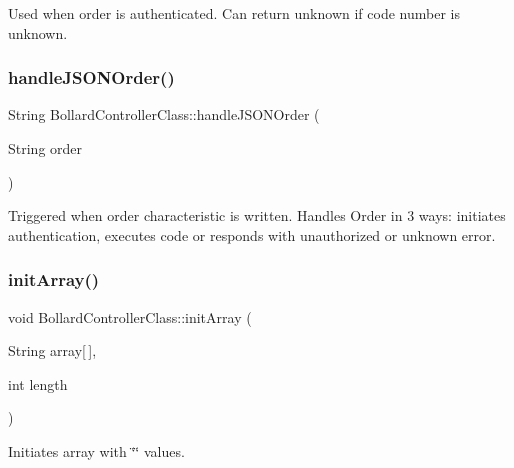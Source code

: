 Used when order is authenticated. Can return unknown if code number is unknown. \mbox{\label{class_bollard_controller_class_a1873a12a6d76aac6d952a08029f3eccd}} 
\subsubsection{\texorpdfstring{handle\+J\+S\+O\+N\+Order()}{handleJSONOrder()}}
{\footnotesize\ttfamily String Bollard\+Controller\+Class\+::handle\+J\+S\+O\+N\+Order (\begin{DoxyParamCaption}\item[{String}]{order }\end{DoxyParamCaption})\hspace{0.3cm}{\ttfamily [private]}}

Triggered when order characteristic is written. Handles Order in 3 ways\+: initiates authentication, executes code or responds with unauthorized or unknown error. \mbox{\label{class_bollard_controller_class_a1e15c0f5b739be3830dc0700842e117e}} 
\subsubsection{\texorpdfstring{init\+Array()}{initArray()}}
{\footnotesize\ttfamily void Bollard\+Controller\+Class\+::init\+Array (\begin{DoxyParamCaption}\item[{String}]{array\mbox{[}$\,$\mbox{]},  }\item[{int}]{length }\end{DoxyParamCaption})\hspace{0.3cm}{\ttfamily [private]}}

Initiates array with \char`\"{}\char`\"{} values. \mbox{\label{class_bollard_controller_class_a09862f010e4d0e0ffbd107e2041079d1}} 
